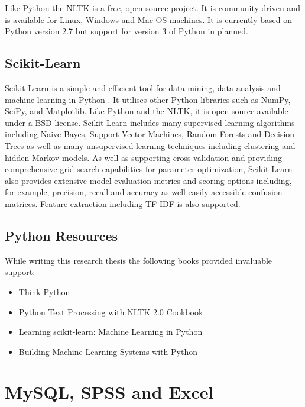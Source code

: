 Like Python the NLTK is a free, open source project. It is community driven and is available for Linux, Windows and Mac OS machines. It is currently based on Python version 2.7 but support for version 3 of Python in planned.

\subsection{Scikit-Learn}

Scikit-Learn is a simple and efficient tool for data mining, data analysis and machine learning in Python \cite{scikit-learn}. It utilises other Python libraries such as NumPy, SciPy, and Matplotlib. Like Python and the NLTK, it is open source available under a BSD license. Scikit-Learn includes many supervised learning algorithms including Naive Bayes, Support Vector Machines, Random Forests and Decision Trees as well as many unsupervised learning techniques including clustering and hidden Markov models. As well as supporting cross-validation and providing comprehensive grid search capabilities for parameter optimization, Scikit-Learn also provides extensive model evaluation metrics and scoring options including, for example, precision, recall and accuracy as well easily accessible confusion matrices. Feature extraction including TF-IDF is also supported.

\subsection{Python Resources}

While writing this research thesis the following books provided invaluable support:

\begin{itemize}

	\item Think Python \cite{downey_think_2012}
	\item Python Text Processing with NLTK 2.0 Cookbook \cite{perkins_python_2010}
	\item Learning scikit-learn: Machine Learning in Python \cite{garreta_learning_2013}
	\item Building Machine Learning Systems with Python \cite{Riegel:2013}

\end{itemize} 

\section{MySQL, SPSS and Excel}

